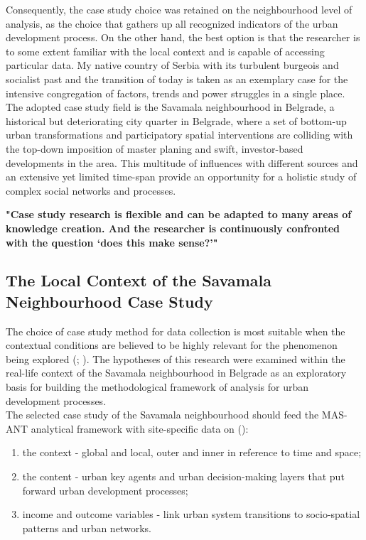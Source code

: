 \documentclass[11pt]{report}
\begin{document}
Consequently, the case study choice was retained on the neighbourhood level of analysis, as the choice that gathers up all recognized indicators of the urban development process. On the other hand, the best option is that the researcher is to some extent familiar with the local context and is capable of accessing particular data. My native country of Serbia with its turbulent burgeois and socialist past and the transition of today is taken as an exemplary case for the intensive congregation of factors, trends and power struggles in a single place. The adopted case study field is the Savamala neighbourhood in Belgrade, a historical but deteriorating city quarter in Belgrade, where a set of bottom-up urban transformations and participatory spatial interventions are colliding with the top-down imposition of master planing and swift, investor-based developments in the area. This multitude of influences with different sources and an extensive yet limited time-span provide an opportunity for a holistic study of complex social networks and processes.

\textbf{"Case study research is flexible and can be adapted to many areas of knowledge creation. And the researcher is continuously confronted with the question ‘does this make sense?’" \href{Harrison}{\citealt{partington_case_2002}}}

\subsection{The Local Context of the Savamala Neighbourhood Case Study}

The choice of case study method for data collection is most suitable when the  contextual  conditions  are  believed  to  be highly relevant for the phenomenon being explored (\href{Robson}{\citealt{robson_real_1993}}; \href{Yin}{\citealt{yin_case_2003}}). The hypotheses of this research were examined within the real-life context of the Savamala neighbourhood in Belgrade as an exploratory basis for building the methodological framework of analysis for urban development processes. 
\\

The selected case study of the Savamala neighbourhood should feed the MAS-ANT analytical framework with site-specific data on (\href{Harrison}{\citealt{partington_case_2002}}):
\begin{enumerate}
\item the context - global and local, outer and inner in reference to time and space;
\item the content - urban key agents and urban decision-making layers that put forward urban development processes;
\item income and outcome variables - link urban system transitions to socio-spatial patterns and urban networks.
\end{enumerate}
\end{document}

